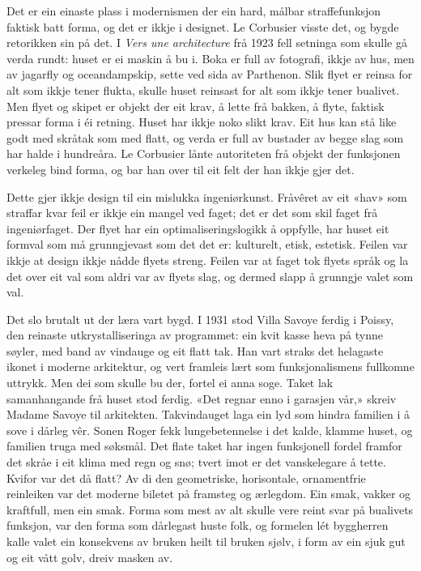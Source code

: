 Det er ein einaste plass i modernismen der ein hard, målbar straffefunksjon faktisk batt forma, og det er ikkje i designet. Le Corbusier visste det, og bygde retorikken sin på det. I \emph{Vers une architecture} frå 1923 fell setninga som skulle gå verda rundt: huset er ei maskin å bu i\autocite{lecorbusier1923}. Boka er full av fotografi, ikkje av hus, men av jagarfly og oceandampskip, sette ved sida av Parthenon. Slik flyet er reinsa for alt som ikkje tener flukta, skulle huset reinsast for alt som ikkje tener bualivet. Men flyet og skipet er objekt der eit krav, å lette frå bakken, å flyte, faktisk pressar forma i éi retning. Huset har ikkje noko slikt krav. Eit hus kan stå like godt med skråtak som med flatt, og verda er full av bustader av begge slag som har halde i hundreåra. Le Corbusier lånte autoriteten frå objekt der funksjonen verkeleg bind forma, og bar han over til eit felt der han ikkje gjer det.

Dette gjer ikkje design til ein mislukka ingeniørkunst. Fråvêret av eit «hav» som straffar kvar feil er ikkje ein mangel ved faget; det er det som skil faget frå ingeniørfaget. Der flyet har ein optimaliseringslogikk å oppfylle, har huset eit formval som må grunngjevast som det det er: kulturelt, etisk, estetisk. Feilen var ikkje at design ikkje nådde flyets streng. Feilen var at faget tok flyets språk og la det over eit val som aldri var av flyets slag, og dermed slapp å grunngje valet som val.

Det slo brutalt ut der læra vart bygd. I 1931 stod Villa Savoye ferdig i Poissy, den reinaste utkrystalliseringa av programmet: ein kvit kasse heva på tynne søyler, med band av vindauge og eit flatt tak. Han vart straks det helagaste ikonet i moderne arkitektur, og vert framleis lært som funksjonalismens fullkomne uttrykk. Men dei som skulle bu der, fortel ei anna soge. Taket lak samanhangande frå huset stod ferdig. «Det regnar enno i garasjen vår,» skreiv Madame Savoye til arkitekten. Takvindauget laga ein lyd som hindra familien i å sove i dårleg vêr. Sonen Roger fekk lungebetennelse i det kalde, klamme huset, og familien truga med søksmål. Det flate taket har ingen funksjonell fordel framfor det skråe i eit klima med regn og snø; tvert imot er det vanskelegare å tette. Kvifor var det då flatt? Av di den geometriske, horisontale, ornamentfrie reinleiken var det moderne biletet på framsteg og ærlegdom. Ein smak, vakker og kraftfull, men ein smak. Forma som mest av alt skulle vere reint svar på bualivets funksjon, var den forma som dårlegast huste folk, og formelen lét byggherren kalle valet ein konsekvens av bruken heilt til bruken sjølv, i form av ein sjuk gut og eit vått golv, dreiv masken av.

